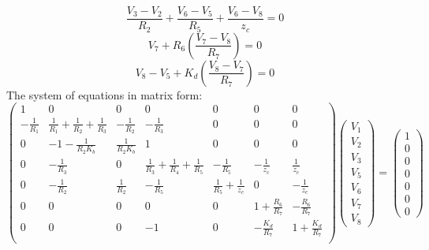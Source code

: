\begin{equation}
    \frac{V_{3}- V_{2}}{R_{2}} + \frac{V_{6}-V_{5}}{R_{5}} + \frac{V_{6}-V_{8}}{z_c} = 0
\end{equation}
\begin{equation}\label{eqn:v8}
    V_{7}+ R_6 \left(\frac{V_{7}-V_{8}}{R_{7}}\right) = 0
\end{equation}
\begin{equation}
  V_{8}-V_{5} + K_d \left(\frac{V_{8}-V_{7}}{R_{7}}\right) = 0
\end{equation}
The system of equations in matrix form: \\
\begin{equation}
\left(\begin{array}{ccccccc} 
1 & 0 & 0 & 0 & 0 & 0 & 0\\
-\frac{1}{R_1} & \frac{1}{R_1}+\frac{1}{R_2}+\frac{1}{R_3} & -\frac{1}{R_2} & -\frac{1}{R_3}& 0 & 0 & 0 \\
0 & -1-\frac{1}{R_2 K_b} & \frac{1}{R_2 K_b} & 1 & 0 & 0 & 0 \\
0 & -\frac{1}{R_3} & 0 & \frac{1}{R_3} +\frac{1}{R_4}+\frac{1}{R_5} & -\frac{1}{R_5} & -\frac{1}{z_c} & \frac{1}{z_c} \\
0 & -\frac{1}{R_2} & \frac{1}{R_2} & -\frac{1}{R_5} & \frac{1}{R_5} + \frac{1}{z_c} & 0 & -\frac{1}{z_c}\\
0 & 0 & 0 & 0 & 0 & 1+\frac{R_6}{R_7} & -\frac{R_6}{R_7} \\
0 & 0 & 0 & -1 & 0 & -\frac{K_d}{R_7} & 1 + \frac{K_d}{R_7} \\
\end{array}\right)
\left(\begin{array}{c} V_1 \\ V_2 \\ V_3 \\ V_5 \\ V_6 \\ V_7 \\ V_8 \end{array}\right) 
= \left(\begin{array}{c} 1 \\ 0 \\ 0 \\ 0 \\0 \\ 0 \\0 \end{array}\right)
\end{equation}

